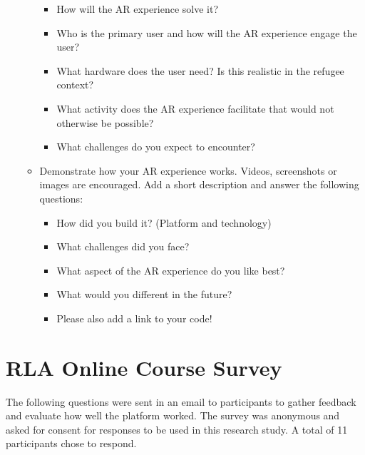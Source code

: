 \documentclass[12pt,twoside,vi]{mitthesis}
\begin{document}
\begin{enumerate}
\begin{itemize}
\begin{itemize}
\item How will the AR experience solve it? 
\item Who is the primary user and how will the AR experience engage the user?
\item What hardware does the user need? Is this realistic in the refugee context? 
\item What activity does the AR experience facilitate that would not otherwise be possible? 
\item What challenges do you expect to encounter? 
\end{itemize}
\item Demonstrate how your AR experience works. Videos, screenshots or images are encouraged. Add a short description and answer the following questions: 
\begin{itemize}
\item How did you build it? (Platform and technology)
\item What challenges did you face?
\item What aspect of the AR experience do you like best? 
\item What would you different in the future? 
\item Please also add a link to your code!
\end{itemize}
\end{itemize}
\end{enumerate}

\chapter{RLA Online Course Survey}

The following questions were sent in an email to participants to gather feedback and evaluate how well the platform worked. The survey was anonymous and asked for consent for responses to be used in this research study. A total of 11 participants chose to respond.
\end{document}
